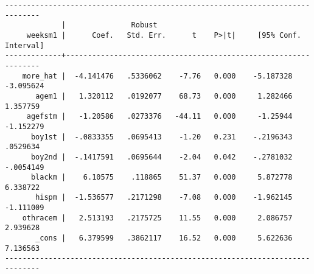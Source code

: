 \documentclass[11pt]{article}
\begin{document}
\begin{verbatim}
------------------------------------------------------------------------------
             |               Robust
     weeksm1 |      Coef.   Std. Err.      t    P>|t|     [95% Conf. Interval]
-------------+----------------------------------------------------------------
    more_hat |  -4.141476   .5336062    -7.76   0.000    -5.187328   -3.095624
       agem1 |   1.320112   .0192077    68.73   0.000     1.282466    1.357759
     agefstm |   -1.20586   .0273376   -44.11   0.000     -1.25944   -1.152279
      boy1st |  -.0833355   .0695413    -1.20   0.231    -.2196343    .0529634
      boy2nd |  -.1417591   .0695644    -2.04   0.042    -.2781032   -.0054149
      blackm |    6.10575    .118865    51.37   0.000     5.872778    6.338722
       hispm |  -1.536577   .2171298    -7.08   0.000    -1.962145   -1.111009
    othracem |   2.513193   .2175725    11.55   0.000     2.086757    2.939628
       _cons |   6.379599   .3862117    16.52   0.000     5.622636    7.136563
------------------------------------------------------------------------------
\end{verbatim}
\end{document}
